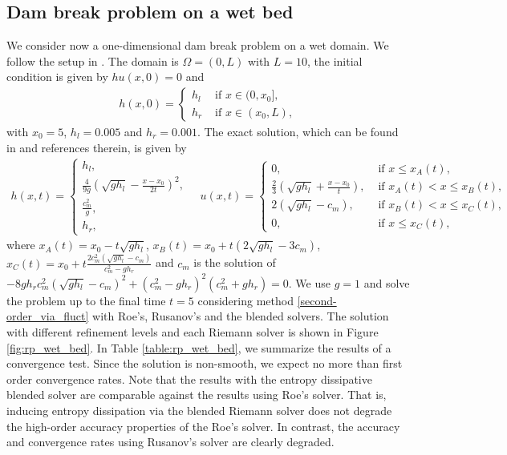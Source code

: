 \documentclass[preprint, 11pt]{article}
\begin{document}
\subsection{Dam break problem on a wet bed}\label{sec:rp_wet_bed}
We consider now a one-dimensional dam break problem on a wet domain. 
We follow the setup in \cite[\S 4.1.1]{delestre2013swashes}. 
The domain is $\Omega=(0,L)$ with $L=10$, the initial condition is given by 
$hu(x,0)=0$ and 
\begin{align*}
  h(x,0) = 
  \begin{cases}
    h_l & \mbox{ if } x\in(0,x_0], \\
    h_r & \mbox{ if } x\in(x_0,L),
  \end{cases}
\end{align*}
with $x_0=5$, $h_l=0.005$ and $h_r=0.001$. 
The exact solution, which can be found in \cite{delestre2013swashes} and references therein,
is given by 
\begin{align*}
  h(x,t) = 
  \begin{cases}
    h_l, \\
    \frac{4}{9g}\left(\sqrt{gh_l}-\frac{x-x_0}{2t}\right)^2, \\
    \frac{c_m^2}{g}, \\
    h_r, 
  \end{cases}
\quad 
  u(x,t) = 
  \begin{cases}
    0, &\mbox{ if } x\leq x_A(t), \\
    \frac{2}{3}\left(\sqrt{gh_l}+\frac{x-x_0}{t}\right), & \mbox{ if } x_A(t) < x\leq x_B(t), \\
    2(\sqrt{gh_l}-c_m), & \mbox{ if } x_B(t)<x\leq x_C(t), \\
    0, &\mbox{ if } x\leq x_C(t),
  \end{cases}
\end{align*}
where $x_A(t)=x_0-t\sqrt{gh_l}$, $x_B(t)=x_0+t\left(2\sqrt{gh_l}-3c_m\right)$, 
$x_C(t)=x_0+t\frac{2c_m^2\left(\sqrt{gh_l}-c_m\right)}{c_m^2-gh_r}$ and 
$c_m$ is the solution of 
$-8gh_rc_m^2\left(\sqrt{gh_l}-c_m\right)^2+\left(c_m^2-gh_r\right)^2\left(c_m^2+gh_r\right)=0$.
We use $g=1$ and solve the problem up to the final time $t=5$ considering method \eqref{second-order_via_fluct}
with Roe's, Rusanov's and the blended solvers. The solution with different refinement levels 
and each Riemann solver is shown in Figure \ref{fig:rp_wet_bed}.
In Table \ref{table:rp_wet_bed}, we summarize the results of a convergence test. 
Since the solution is non-smooth, we expect no more than first order convergence rates. Note that the 
results with the entropy dissipative blended solver are comparable against the results using Roe's solver. 
That is, inducing entropy dissipation via the blended Riemann solver does not degrade the high-order
accuracy properties of the Roe's solver. 
In contrast, the accuracy and convergence rates using Rusanov's solver are clearly degraded.  
\end{document}
